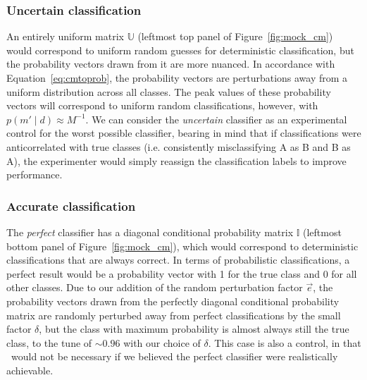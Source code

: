 \subsubsection{Uncertain classification}
\label{sec:uncertaindata}

An entirely uniform  matrix $\mathbb{U}$ (leftmost top panel of Figure~\ref{fig:mock_cm}) would correspond to uniform random guesses for deterministic classification, but the probability vectors drawn from it are more nuanced.
In accordance with Equation~\ref{eq:cmtoprob}, the probability vectors are perturbations away from a uniform distribution across all classes.
The peak values of these probability vectors will correspond to uniform random classifications, however, with $p(m' \mid d)\approx M^{-1}$.
We can consider the \textit{uncertain} classifier as an experimental control for the worst possible classifier, bearing in mind that if classifications were anticorrelated with true classes (i.e. consistently misclassifying A as B and B as A), the experimenter would simply reassign the classification labels to improve performance.

\subsubsection{Accurate classification}
\label{sec:accuratedata}

The \textit{perfect} classifier has a diagonal conditional probability matrix $\mathbb{I}$ (leftmost bottom panel of Figure~\ref{fig:mock_cm}), which would correspond to deterministic classifications that are always correct.
In terms of probabilistic classifications, a perfect result would be a probability vector with 1 for the true class and 0 for all other classes.
Due to our addition of the random perturbation factor $\vec{e}$, the probability vectors drawn from the perfectly diagonal conditional probability matrix are randomly perturbed away from perfect classifications by the small factor $\delta$, but the class with maximum probability is almost always still the true class, to the tune of $\sim0.96$ with our choice of $\delta$.
This case is also a control, in that \plasticc\ would not be necessary if we believed the perfect classifier were realistically achievable.

